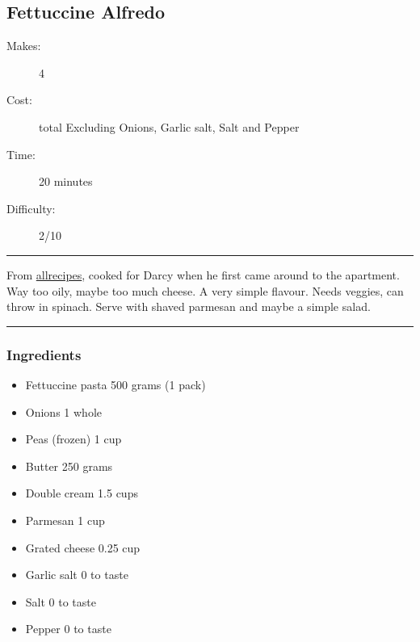 \documentclass[]{article}
\begin{document}
\subsection*{\center\huge Fettuccine Alfredo}
\begin{description}
\item[Makes:] 4 
\item[Cost:]  total Excluding Onions, Garlic salt, Salt and Pepper
\item[Time:] 20 minutes
\item[Difficulty:] 2/10
\end{description}
\vspace{0.2cm}\hrule\vspace{0.5cm}
\begin{adjustwidth}{0.5 cm}{0.5 cm}

From \href{https://www.allrecipes.com/recipe/23431/to-die-for-fettuccine-alfredo/}{allrecipes}, cooked for Darcy when he first came around to the apartment. Way too oily, maybe too much cheese. A very simple flavour. Needs veggies, can throw in spinach. Serve with shaved parmesan and maybe a simple salad. \hfill{}\color{black}

\end{adjustwidth}
\vspace{0.5cm}\hrule
\subsubsection*{\Large Ingredients}
\begin{multicols}{2}
\begin{itemize}
 \item Fettuccine pasta \hfill 500 grams (1 pack)
 \item Onions \hfill 1 whole
 \item Peas (frozen) \hfill 1 cup
 \item Butter \hfill 250 grams
 \item Double cream \hfill 1.5 cups
 \item Parmesan \hfill 1 cup
 \item Grated cheese \hfill 0.25 cup
 \item Garlic salt \hfill 0 to taste
 \item Salt \hfill 0 to taste
 \item Pepper \hfill 0 to taste
\end{itemize}
\end{multicols}
\end{document}

